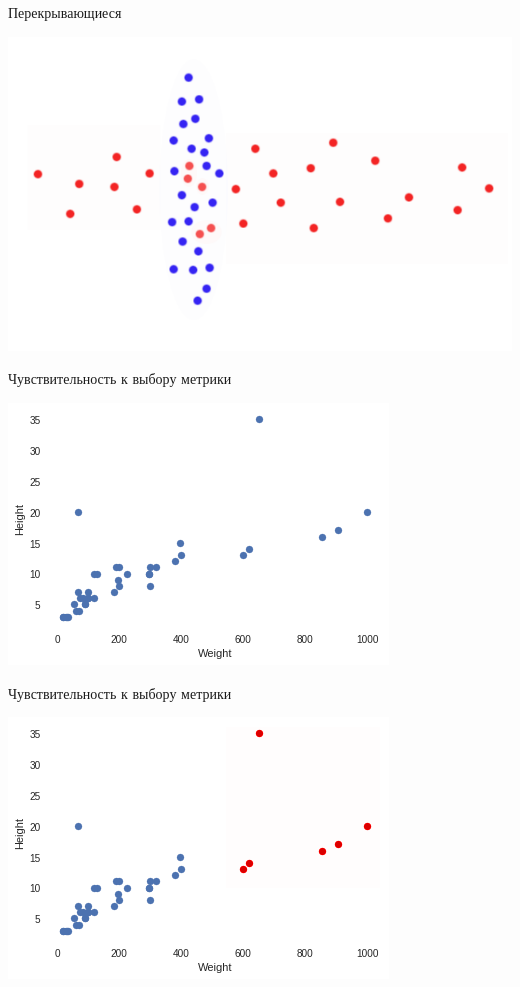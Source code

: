 \documentclass[10pt]{beamer}
\begin{document}
\begin{frame}{Перекрывающиеся}
	\begin{center}
	  \includegraphics[height=0.8 \textheight, keepaspectratio = true]{images/cluster6}  
	\end{center}
\end{frame}

\begin{frame}{Чувствительность к выбору метрики}
	\begin{center}
	  \includegraphics[height=0.8 \textheight, keepaspectratio = true]{images/weight_height1}  
	\end{center}
\end{frame}

\begin{frame}{Чувствительность к выбору метрики}
	\begin{center}
	  \includegraphics[height=0.8 \textheight, keepaspectratio = true]{images/weight_height2}  
	\end{center}
\end{frame}
\end{document}
